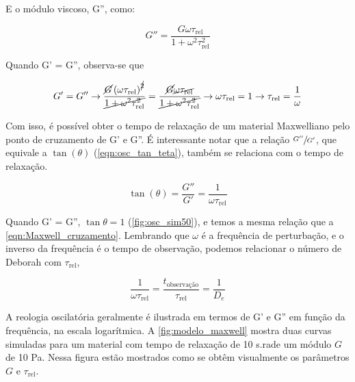 			E o módulo viscoso, G'', como:
			
			\begin{equation}
				G'' = \dfrac{  G \omega  \tau_{\textrm{rel}}        }{ 1 + \omega^2 \tau_{\textrm{rel}}^2 }
				\label{eqn:Maxwell_G2_def}
			\end{equation} 
			
			Quando G' = G'', observa-se que
			
			\begin{equation}
				G' = G'' \to %
				\dfrac{{ \cancel{G}}   \left(\omega \tau_{\textrm{rel}}\right)^{\cancel{2}}   }{{\cancel{1 + \omega^2 \tau_{\textrm{rel}}^2      }}} = %
				\dfrac{ {\cancel{G}} \cancel{\omega \tau_{\textrm{rel}} }}                   {{\cancel{1 + \omega^2 \tau_{\textrm{rel}}^2      }}}    \to %
				\omega \tau_{\mathrm{rel}} = 1 \to \tau_{\mathrm{rel}} = \dfrac{1}{\omega}
				\label{eqn:cruzamento_g1_g2}			
			\end{equation}
			
			Com isso, é possível obter o tempo de relaxação de um material Maxwelliano pelo ponto de cruzamento de G' e G''. É interessante notar que a relação \(\sfrac{G''}{G'}\), que equivale a \(\tan(\theta)\) (\autoref{eqn:osc_tan_teta}), também se relaciona com o tempo de relaxação. 
			
			\begin{equation}
				\tan(\theta) = \dfrac{G''}{G'} = \dfrac{1}{\omega\tau_{\textrm{rel}}}
				\label{eqn:Maxwell_cruzamento}
			\end{equation}  %
			
			Quando G' = G'', \(\tan \theta = 1\) (\autoref{fig:osc_sim50}), e temos a mesma relação que a \autoref{eqn:Maxwell_cruzamento}. Lembrando que \(\omega\) é a frequência de perturbação, e o inverso da frequência é o tempo de observação, podemos relacionar o número de Deborah com \(\tau_\mathrm{rel}\),
			
			\begin{equation}
				\dfrac{1}{\omega\tau_{\textrm{rel}}} = \dfrac{ t_{\textrm{observação}  }}{ \tau_{\textrm{rel}}  } = \dfrac{1}{D_e}
				\label{eqn:Maxwell_cruzamento_Deborah}
			\end{equation} 

			A reologia oscilatória geralmente é ilustrada em termos de G' e G'' em função da frequência, na escala logarítmica. A \autoref{fig:modelo_maxwell} mostra duas curvas simuladas para um material com tempo de relaxação de 10 s.rad\menosUm e um módulo \(G\) de 10 Pa. Nessa figura estão mostrados como se obtêm visualmente os parâmetros \(G\) e \(\tau_{\mathrm{rel}}\).
			
